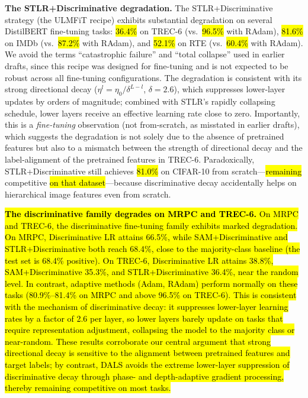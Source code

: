 \documentclass[a4paper,fleqn]{cas-dc}
\begin{document}
{\sloppy \textbf{The STLR+Discriminative degradation.} The STLR+Discriminative strategy (the ULMFiT recipe) exhibits substantial degradation on several DistilBERT fine-tuning tasks: \hl{36.4\%} on TREC-6 (vs.\ \hl{96.5\%} with RAdam), \hl{81.6\%} on IMDb (vs.\ \hl{87.2\%} with RAdam), and \hl{52.1\%} on RTE (vs.\ \hl{60.4\%} with RAdam). We avoid the terms ``catastrophic failure'' and ``total collapse'' used in earlier drafts, since this recipe was designed for fine-tuning and is not expected to be robust across all fine-tuning configurations. The degradation is consistent with its strong directional decay ($\eta^l = \eta_0 / \delta^{L-l}$, $\delta=2.6$), which suppresses lower-layer updates by orders of magnitude; combined with STLR's rapidly collapsing schedule, lower layers receive an effective learning rate close to zero. Importantly, this is a \emph{fine-tuning} observation (not from-scratch, as misstated in earlier drafts), which suggests the degradation is not solely due to the absence of pretrained features but also to a mismatch between the strength of directional decay and the label-alignment of the pretrained features in TREC-6. Paradoxically, STLR+Discriminative still achieves \hl{81.0\%} on CIFAR-10 from scratch---\hl{remaining} competitive \hl{on that dataset}---because discriminative decay accidentally helps on hierarchical image features even from scratch.\par}

\hl{\textbf{The discriminative family degrades on MRPC and TREC-6.} On MRPC and TREC-6, the discriminative fine-tuning family exhibits marked degradation. On MRPC, Discriminative LR attains 66.5\%, while SAM+Discriminative and STLR+Discriminative both reach 68.4\%, close to the majority-class baseline (the test set is 68.4\% positive). On TREC-6, Discriminative LR attains 38.8\%, SAM+Discriminative 35.3\%, and STLR+Discriminative 36.4\%, near the random level. In contrast, adaptive methods (Adam, RAdam) perform normally on these tasks (80.9\%--81.4\% on MRPC and above 96.5\% on TREC-6). This is consistent with the mechanism of discriminative decay: it suppresses lower-layer learning rates by a factor of 2.6 per layer, so lower layers barely update on tasks that require representation adjustment, collapsing the model to the majority class or near-random. These results corroborate our central argument that strong directional decay is sensitive to the alignment between pretrained features and target labels; by contrast, DALS avoids the extreme lower-layer suppression of discriminative decay through phase- and depth-adaptive gradient processing, thereby remaining competitive on most tasks.}
\end{document}
